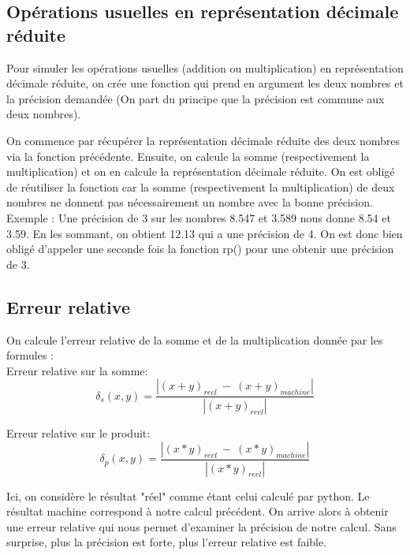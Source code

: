 \documentclass{article}
\begin{document}
\subsection*{Opérations usuelles en représentation décimale réduite}

Pour simuler les opérations usuelles (addition ou multiplication) en représentation décimale réduite, on crée une fonction qui prend en argument les deux nombres et la précision demandée (On part du principe que la précision est commune aux deux nombres).

On commence par récupérer la représentation décimale réduite des deux nombres via la fonction précédente. Ensuite, on calcule la somme (respectivement la multiplication) et on en calcule la représentation décimale réduite. On est obligé de réutiliser la fonction car la somme (respectivement la multiplication) de deux nombres ne donnent pas nécessairement un nombre avec la bonne précision. \\

Exemple :
Une précision de 3 sur les nombres 8.547 et 3.589 nous donne 8.54 et 3.59. En les sommant, on obtient 12.13 qui a une précision de 4. On est donc bien obligé d'appeler une seconde fois la fonction rp() pour une obtenir une précision de 3.

\subsection*{Erreur relative}

On calcule l'erreur relative de la somme et de la multiplication donnée par les formules :
\\

Erreur relative sur la somme:
\begin{equation}
\delta_{s}(x,y) = \frac{ \left |  (x+y)_{reel}\ - \ (x+y)_{machine} \right | }{\left |  (x+y)_{reel} \right | }
\label{erreur_relative_sur_la_somme}
\end{equation}

Erreur relative sur le produit:
\begin{equation}
\delta_{p}(x,y) = \frac{ \left |  (x*y)_{reel}\ - \ (x*y)_{machine} \right | }{\left |  (x*y)_{reel} \right | }
\label{erreur_relative_sur_le_produi}
\end{equation}

Ici, on considère le résultat "réel" comme étant celui calculé par python. Le résultat machine correspond à notre calcul précédent. On arrive alors à obtenir une erreur relative qui nous permet d'examiner la précision de notre calcul. 
Sans surprise, plus la précision est forte, plus l'erreur relative est faible.
\end{document}
